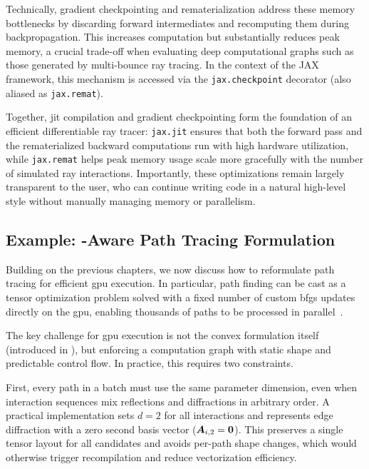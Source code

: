 Technically, gradient checkpointing and rematerialization address these memory bottlenecks by discarding forward intermediates and recomputing them during backpropagation. This increases computation but substantially reduces peak memory, a crucial trade-off when evaluating deep computational graphs such as those generated by multi-bounce ray tracing. In the context of the JAX framework, this mechanism is accessed via the \texttt{jax.checkpoint} decorator (also aliased as \texttt{jax.remat}).

Together, \gls{jit} compilation and gradient checkpointing form the foundation of an efficient differentiable ray tracer: \texttt{jax.jit} ensures that both the forward pass and the rematerialized backward computations run with high hardware utilization, while \texttt{jax.remat} helps peak memory usage scale more gracefully with the number of simulated ray interactions. Importantly, these optimizations remain largely transparent to the user, who can continue writing code in a natural high-level style without manually managing memory or parallelism.

\subsection{Example: -Aware Path Tracing Formulation}

Building on the previous chapters, we now discuss how to reformulate path tracing for efficient \gls{gpu} execution. In particular, path finding can be cast as a tensor optimization problem solved with a fixed number of custom \gls{bfgs} updates directly on the \gls{gpu}, enabling thousands of paths to be processed in parallel~.

The key challenge for \gls{gpu} execution is not the convex formulation itself (introduced in ), but enforcing a computation graph with static shape and predictable control flow. In practice, this requires two constraints.

First, every path in a batch must use the same parameter dimension, even when interaction sequences mix reflections and diffractions in arbitrary order. A practical implementation sets $d=2$ for all interactions and represents edge diffraction with a zero second basis vector ($\boldsymbol{A}_{i,2}=\mathbf{0}$). This preserves a single tensor layout for all candidates and avoids per-path shape changes, which would otherwise trigger recompilation and reduce vectorization efficiency.

